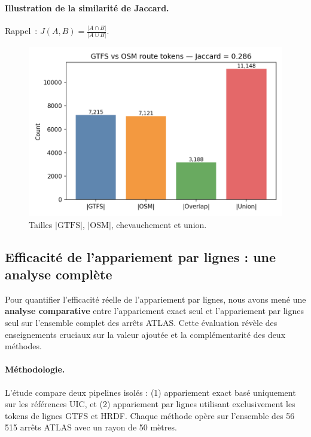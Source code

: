\paragraph{Illustration de la similarité de Jaccard.} Rappel : \(J(A,B) = \frac{|A \cap B|}{|A \cup B|}\).

\begin{figure}[H]
  \centering
  \includegraphics[width=\textwidth]{../figures/chap4/jaccard_sets_bars.png}
  \caption*{Tailles \(|\mathrm{GTFS}|\), \(|\mathrm{OSM}|\), chevauchement et union.}
\end{figure}

\subsection{Efficacité de l'appariement par lignes : une analyse complète}
Pour quantifier l'efficacité réelle de l'appariement par lignes, nous avons mené une \textbf{analyse comparative} entre l'appariement exact seul et l'appariement par lignes seul sur l'ensemble complet des arrêts ATLAS. Cette évaluation révèle des enseignements cruciaux sur la valeur ajoutée et la complémentarité des deux méthodes.

\paragraph{Méthodologie.} L'étude compare deux pipelines isolés : (1) appariement exact basé uniquement sur les références UIC, et (2) appariement par lignes utilisant exclusivement les tokens de lignes GTFS et HRDF. Chaque méthode opère sur l'ensemble des 56\,515 arrêts ATLAS avec un rayon de 50 mètres.


